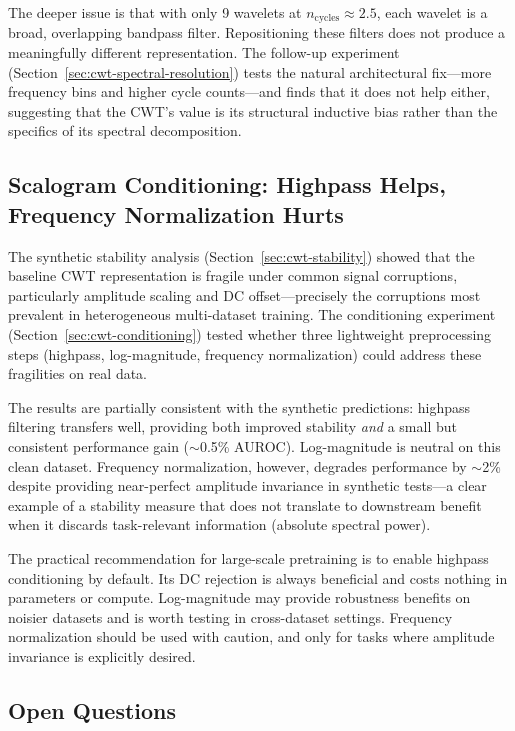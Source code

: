 \documentclass[11pt, a4paper]{article}
\begin{document}
The deeper issue is that with only 9 wavelets at $n_\text{cycles}
\approx 2.5$, each wavelet is a broad, overlapping bandpass filter.
Repositioning these filters does not produce a meaningfully different
representation. The follow-up experiment
(Section~\ref{sec:cwt-spectral-resolution}) tests the natural
architectural fix---more frequency bins and higher cycle counts---and
finds that it does not help either, suggesting that the CWT's value
is its structural inductive bias rather than the specifics of its
spectral decomposition.

\subsection{Scalogram Conditioning: Highpass Helps,
Frequency Normalization Hurts}

The synthetic stability analysis
(Section~\ref{sec:cwt-stability}) showed that the baseline CWT
representation is fragile under common signal corruptions,
particularly amplitude scaling and DC offset---precisely the
corruptions most prevalent in heterogeneous multi-dataset training.
The conditioning experiment
(Section~\ref{sec:cwt-conditioning}) tested whether three
lightweight preprocessing steps (highpass, log-magnitude, frequency
normalization) could address these fragilities on real data.

The results are partially consistent with the synthetic predictions:
highpass filtering transfers well, providing both improved stability
\emph{and} a small but consistent performance gain ($\sim$0.5\%
AUROC).  Log-magnitude is neutral on this clean dataset.
Frequency normalization, however, degrades performance by
$\sim$2\% despite providing near-perfect amplitude invariance in
synthetic tests---a clear example of a stability measure that does
not translate to downstream benefit when it discards
task-relevant information (absolute spectral power).

The practical recommendation for large-scale pretraining is to
enable highpass conditioning by default.  Its DC rejection is
always beneficial and costs nothing in parameters or compute.
Log-magnitude may provide robustness benefits on noisier datasets
and is worth testing in cross-dataset settings.  Frequency
normalization should be used with caution, and only for tasks where
amplitude invariance is explicitly desired.

\subsection{Open Questions}
\end{document}
